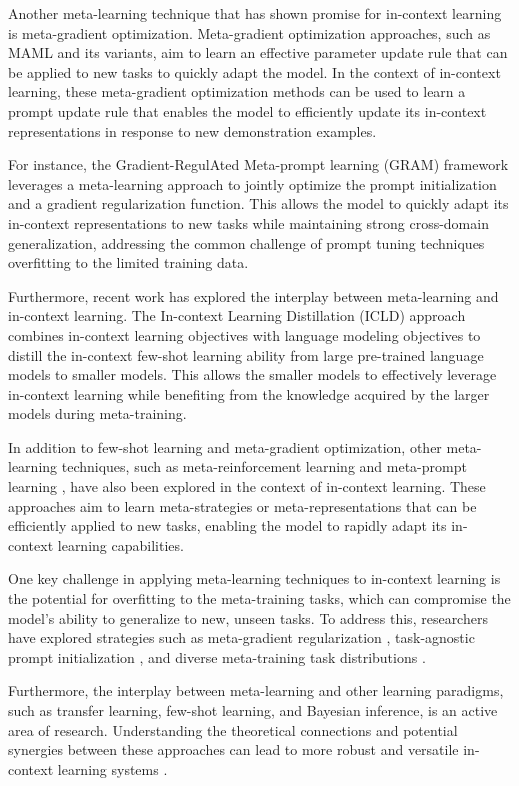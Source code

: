 \documentclass[11pt]{article}
\begin{document}
Another meta-learning technique that has shown promise for in-context learning is meta-gradient optimization. Meta-gradient optimization approaches, such as MAML and its variants, aim to learn an effective parameter update rule that can be applied to new tasks to quickly adapt the model. In the context of in-context learning, these meta-gradient optimization methods can be used to learn a prompt update rule that enables the model to efficiently update its in-context representations in response to new demonstration examples.

For instance, the Gradient-RegulAted Meta-prompt learning (GRAM) framework \cite{ref82} leverages a meta-learning approach to jointly optimize the prompt initialization and a gradient regularization function. This allows the model to quickly adapt its in-context representations to new tasks while maintaining strong cross-domain generalization, addressing the common challenge of prompt tuning techniques overfitting to the limited training data.

Furthermore, recent work has explored the interplay between meta-learning and in-context learning. The In-context Learning Distillation (ICLD) approach \cite{ref31} combines in-context learning objectives with language modeling objectives to distill the in-context few-shot learning ability from large pre-trained language models to smaller models. This allows the smaller models to effectively leverage in-context learning while benefiting from the knowledge acquired by the larger models during meta-training.

In addition to few-shot learning and meta-gradient optimization, other meta-learning techniques, such as meta-reinforcement learning \cite{ref83} and meta-prompt learning \cite{ref84}, have also been explored in the context of in-context learning. These approaches aim to learn meta-strategies or meta-representations that can be efficiently applied to new tasks, enabling the model to rapidly adapt its in-context learning capabilities.

One key challenge in applying meta-learning techniques to in-context learning is the potential for overfitting to the meta-training tasks, which can compromise the model's ability to generalize to new, unseen tasks. To address this, researchers have explored strategies such as meta-gradient regularization \cite{ref84}, task-agnostic prompt initialization \cite{ref85}, and diverse meta-training task distributions \cite{ref81}.

Furthermore, the interplay between meta-learning and other learning paradigms, such as transfer learning, few-shot learning, and Bayesian inference, is an active area of research. Understanding the theoretical connections and potential synergies between these approaches can lead to more robust and versatile in-context learning systems \cite{ref86}.
\end{document}
